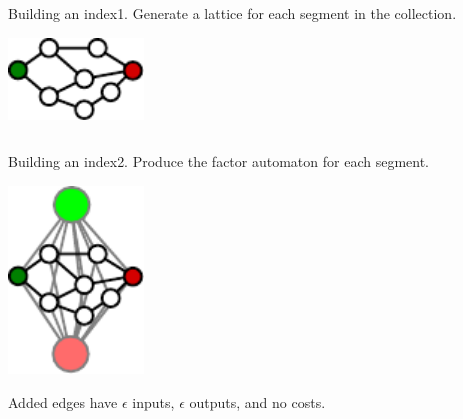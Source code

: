 
\begin{frame}{Building an index}{1. Generate a lattice for each segment in the collection.}
  \begin{center}
    \includegraphics[width=36mm]{figures/lattice}
  \end{center}
  \begin{overlayarea}{\textwidth}{24mm}
    \begin{columns}[t]
      \column{54mm}
      \column{54mm}
    \end{columns}
  \end{overlayarea}
\end{frame}

\begin{frame}{Building an index}{2. Produce the factor automaton for each segment.}
  \begin{center}
    \includegraphics[width=36mm]{figures/factor}
    \end{center}
  \vfill
  Added edges have $\epsilon$ inputs, $\epsilon$ outputs, and no costs.
\end{frame}

